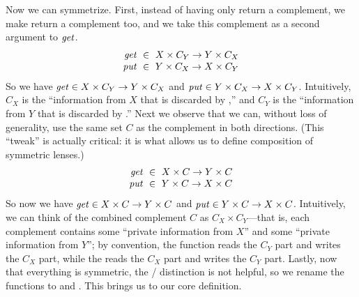 %
Now we can symmetrize.  
First, instead of having only \GET{} return a complement, we make \PUT{}
return a complement too, and we take this complement as a second argument
to $\mathit{get}$.
%
\iffull
\[
\begin{array}{r@{\ \;}c@{\ \;}l}
\GET &\in& X \times C_Y \arrow Y \times C_X\\
\PUT &\in& Y \times C_X \arrow X \times C_Y
\end{array}
\]
\else
So we have $\mathit{get} \in X \times C_Y \rightarrow Y \times C_X$ and 
$\mathit{put} \in Y \times C_X \rightarrow X \times C_Y$.
\fi
%
Intuitively, $C_X$ is the ``information from $X$ that is discarded by
\GET,'' and $C_Y$ is the ``information from $Y$ that is discarded by
\PUT.''  Next we observe that we can, without loss of generality, use the
same set $C$ as the complement in both directions.  \iffull (This ``tweak''
is actually critical: it is what allows us to define composition of symmetric
lenses.)\fi
\iffull
\[
\begin{array}{r@{\ \;}c@{\ \;}l}
\GET &\in& X \times C \arrow Y \times C\\
\PUT &\in& Y \times C \arrow X \times C
\end{array}
\]
\else
So now we have 
$\mathit{get} \in X \times C \rightarrow Y \times C$ and
$\mathit{put} \in Y \times C \rightarrow X \times C$.
\fi
%
Intuitively, we can think of the combined complement $C$ as $C_X \times
C_Y$---that is, each complement contains some ``private information from
$X$'' and some ``private information from $Y$''; by convention, the \GET{}
function reads the $C_Y$ part and writes the $C_X$ part, while the \PUT{}
reads the $C_X$ part and writes the $C_Y$ part.  
%
Lastly, now that everything is symmetric, the \GET{} / \PUT{} distinction is not
helpful, so we rename the functions to \PUTR{} and \PUTL.  This brings us to
our core definition.

